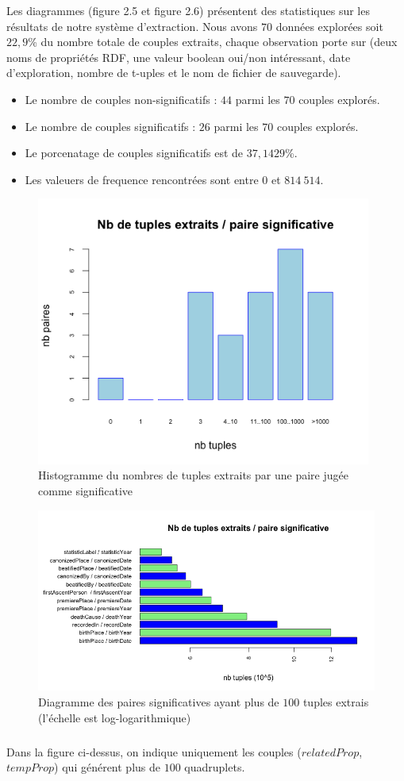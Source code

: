 Les diagrammes (figure 2.5 et figure 2.6) présentent des statistiques sur les résultats de notre système d'extraction.
Nous avons $70$ données explorées soit $22,9$\% du nombre totale de couples extraits, chaque observation porte sur (deux noms de propriétés RDF, une valeur boolean oui/non intéressant, date d'exploration, nombre de t-uples et le nom de fichier de sauvegarde).
\begin{itemize}
\item Le nombre de couples non-significatifs : $44$ parmi les $70$ couples explorés.
\item Le nombre de couples significatifs :  $26$ parmi les $70$ couples explorés.
\item Le porcenatage de couples significatifs est de $37,1429$\%.
\item Les valeuers de frequence rencontrées sont entre $0$ et $814~514$.

\end{itemize}
 \begin{figure}[H]
        \centering
                \includegraphics[width=11cm]{dessin1.png}
               \caption{Histogramme du nombres de tuples extraits par une paire jugée comme significative}
\end{figure}

\begin{figure}[H]
        \centering
                \includegraphics[width=12cm]{dessin2.png}
               \caption{Diagramme des paires significatives ayant plus de $100$ tuples extrais (l'échelle est log-logarithmique)}
\end{figure}
\subparagraph{}
Dans la figure ci-dessus, on indique uniquement les couples ($relatedProp$, $tempProp$) qui générent plus de $100$ quadruplets.
